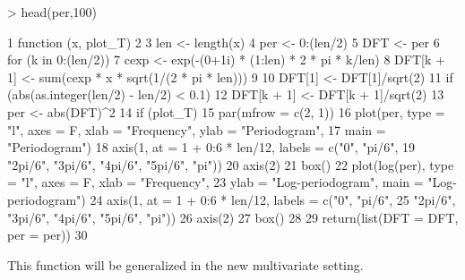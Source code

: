 \documentclass[a4paper]{book}
\begin{document}
\begin{Schunk}
\begin{Sinput}
> head(per,100)
\end{Sinput}
\begin{Soutput}
1  function (x, plot_T)                                                              
2  {                                                                                 
3      len <- length(x)                                                              
4      per <- 0:(len/2)                                                              
5      DFT <- per                                                                    
6      for (k in 0:(len/2)) {                                                        
7          cexp <- exp(-(0+1i) * (1:len) * 2 * pi * k/len)                           
8          DFT[k + 1] <- sum(cexp * x * sqrt(1/(2 * pi * len)))                      
9      }                                                                             
10     DFT[1] <- DFT[1]/sqrt(2)                                                      
11     if (abs(as.integer(len/2) - len/2) < 0.1)                                     
12         DFT[k + 1] <- DFT[k + 1]/sqrt(2)                                          
13     per <- abs(DFT)^2                                                             
14     if (plot_T) {                                                                 
15         par(mfrow = c(2, 1))                                                      
16         plot(per, type = "l", axes = F, xlab = "Frequency", ylab = "Periodogram", 
17             main = "Periodogram")                                                 
18         axis(1, at = 1 + 0:6 * len/12, labels = c("0", "pi/6",                    
19             "2pi/6", "3pi/6", "4pi/6", "5pi/6", "pi"))                            
20         axis(2)                                                                   
21         box()                                                                     
22         plot(log(per), type = "l", axes = F, xlab = "Frequency",                  
23             ylab = "Log-periodogram", main = "Log-periodogram")                   
24         axis(1, at = 1 + 0:6 * len/12, labels = c("0", "pi/6",                    
25             "2pi/6", "3pi/6", "4pi/6", "5pi/6", "pi"))                            
26         axis(2)                                                                   
27         box()                                                                     
28     }                                                                             
29     return(list(DFT = DFT, per = per))                                            
30 }                                                                                 
\end{Soutput}
\end{Schunk}
This function will be generalized in the new multivariate setting.
\end{document}

